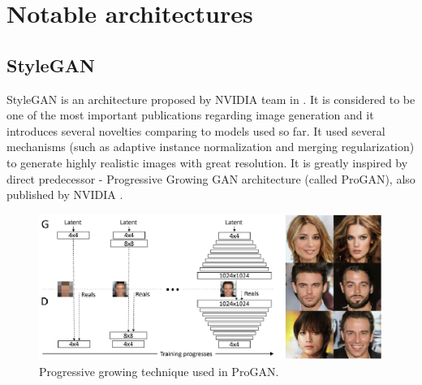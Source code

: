\documentclass[11pt,a4paper,openany]{book}
\begin{document}


\chapter{Notable architectures}
\section{StyleGAN}

\noindent StyleGAN is an architecture proposed by NVIDIA team in \cite{stylegan}. It is considered to be one of the most important publications regarding image generation and it introduces several novelties comparing to models used so far. It used several mechanisms (such as adaptive instance normalization and merging regularization) to generate highly realistic images with great resolution. It is greatly inspired by direct predecessor - Progressive Growing GAN architecture (called ProGAN), also published by NVIDIA \cite{progan}.

\begin{figure}[ht!]
    \centering
    \includegraphics[scale=1.0]{figs/progan-scheme.eps}
    \caption{Progressive growing technique used in ProGAN.}\label{Fig:PROGAN}
\end{figure}
\end{document}
